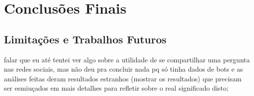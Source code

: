 \chapter{Conclusões Finais}


\section{Limitações e Trabalhos Futuros}
falar que eu até tentei ver algo sobre a utilidade de se compartilhar uma pergunta nas redes sociais, mas não deu pra concluir nada pq só tinha dados de bots e as análises feitas deram resultados estranhos (mostrar os resultados) que precisam ser esmiuçados em mais detalhes para refletir sobre o real significado disto;

